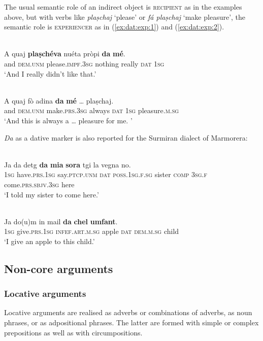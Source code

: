 The usual semantic role of an indirect object is \textsc{recipient} as in the examples above, but with verbs like \textit{plaṣchaj} `please' or \textit{fá plaṣchaj} `make pleasure', the semantic role is  \textsc{experiencer} as in (\ref{ex:dat:exp:1}) and (\ref{ex:dat:exp:2}).

\ea\label{ex:dat:exp:1}
\\
\gll A quaj \textbf{plaṣchéva} nuéta pròpi \textbf{da} \textbf{mé}. \\
and \textsc{dem.unm} please.\textsc{impf.3sg} nothing really \textsc{dat} \textsc{1sg}   \\
\glt `And I really didn’t like that.'
\z

\ea
\label{ex:dat:exp:2}
\\
\gll  A quaj fò adina \textbf{da} \textbf{mé} … plaṣchaj.  \\
and \textsc{dem.unm} make.\textsc{prs.3sg} always \textsc{dat} \textsc{1sg} {} pleasure.\textsc{m.sg} \\
\glt `And this is always a … pleasure for me. '
\z

\textit{Da} as a dative marker is also reported for the Surmiran dialect of Marmorera:

\ea\label{}
\\
\gll  Ja da detg \textbf{da} \textbf{mia} \textbf{sora} tgi la vegna no.\\
\textsc{1sg} have.\textsc{prs.1sg} say.\textsc{ptcp.unm} \textsc{dat} \textsc{poss.1sg.f.sg} sister \textsc{comp} \textsc{3sg.f} come.\textsc{prs.sbjv.3sg} here\\
\glt `I told my sister to come here.'
\z

\ea\label{}
\\
\gll  Ja do(u)m in mail \textbf{da} \textbf{chel} \textbf{umfant}.\\
\textsc{1sg} give.\textsc{prs.1sg} \textsc{infef.art.m.sg} apple \textsc{dat} \textsc{dem.m.sg} child\\
\glt `I give an apple to this child.'
\z

\subsection{Non-core arguments}

\subsubsection{Locative arguments}
Locative arguments are realised as adverbs or combinations of adverbs, as noun phrases, or as adpositional phrases. The latter are formed with simple or complex prepositions as well as with circumpositions.

